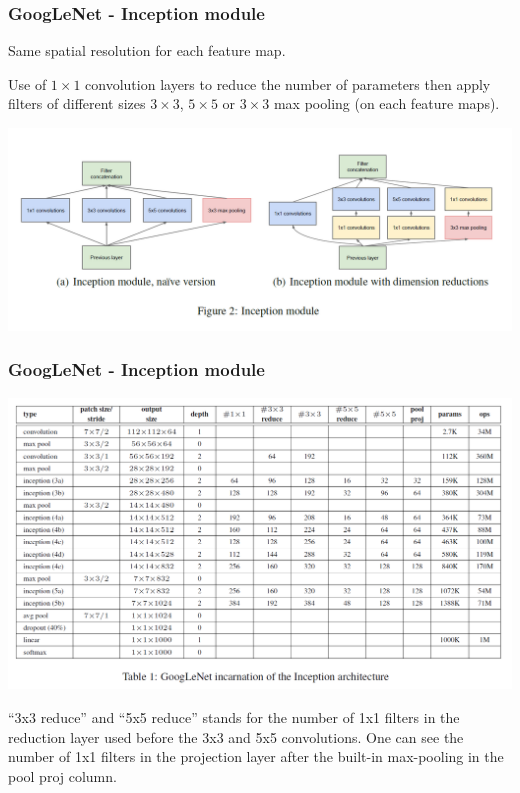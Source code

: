 \begin{frame}
	\frametitle{GoogLeNet - Inception module}
	
	Same spatial resolution for each feature map. 
	
	\smallskip
		
	Use of $1\times 1$ convolution layers to reduce the number of parameters then apply filters of different sizes $3 \times 3$, $5 \times 5$ or $3 \times 3$ max pooling (on each feature maps).
	
	

\begin{center}
	\includegraphics[scale=0.65]{figs/GoogLeNet_inception_module}
\end{center}
	
	
	
\end{frame}

\begin{frame}
	\frametitle{GoogLeNet - Inception module}
	
	\vspace{-0.8cm}
	
	\begin{center}
		\includegraphics[scale=0.6]{figs/GoogLeNet_structure}
	\end{center}
	
	{\footnotesize ``3x3 reduce'' and ``5x5 reduce'' stands for the number of 1x1 filters in the reduction
	layer used before the 3x3 and 5x5 convolutions. One can see the number of 1x1 filters in the projection
	layer after the built-in max-pooling in the pool proj column.}
	
\end{frame}

